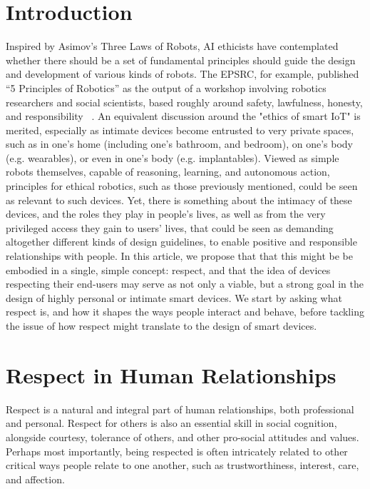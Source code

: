 \documentclass{IETpaper}
\begin{document}
\section{Introduction}%
Inspired by Asimov's Three Laws of Robots, AI ethicists have contemplated whether there should be a set of fundamental principles should guide the design and development of various kinds of robots. The EPSRC, for example, published ``5 Principles of Robotics'' as the output of a workshop involving robotics researchers and social scientists, based roughly around safety, lawfulness, honesty, and responsibility ~\cite{boden2011principles}.
An equivalent discussion around the "ethics of smart IoT" is merited, especially as intimate devices become entrusted to very private spaces, such as in one's home (including one's bathroom, and bedroom), on one's body (e.g. wearables), or even in one's body (e.g. implantables).  Viewed as simple robots themselves, capable of reasoning, learning, and autonomous action, principles for ethical robotics, such as those previously mentioned, could be seen as relevant to such devices.  Yet, there is something about the intimacy of these devices, and the roles they play in people's lives, as well as from  the very privileged access they gain to users' lives, that could be seen as demanding altogether different kinds of design guidelines, to enable positive and responsible relationships with people. 
In this article, we propose that that this might be be embodied in a single, simple concept: respect, and that the idea of devices respecting their end-users may serve as not only a viable, but a strong goal in the design of highly personal or intimate smart devices. We start by asking what respect is, and how it shapes the ways people interact and behave, before tackling the issue of how respect might translate to the design of smart devices.

\section{Respect in Human Relationships}

Respect is a natural and integral part of human relationships, both professional and personal. Respect for others is also an essential skill in social cognition, alongside courtesy, tolerance of others, and other pro-social attitudes and values.  Perhaps most importantly, being respected is often intricately related to other critical ways people relate to one another, such as trustworthiness, interest, care, and affection.
\end{document}

